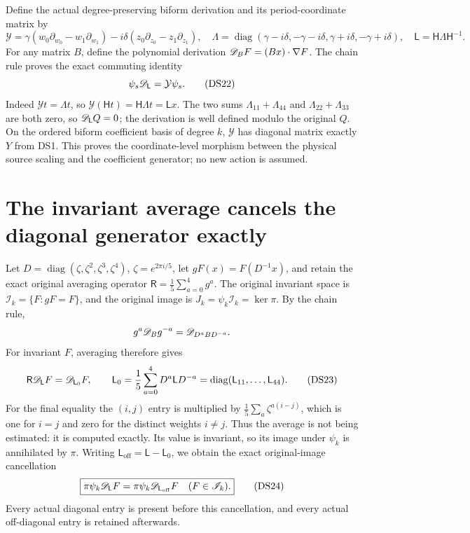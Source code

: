\documentclass[11pt]{article}
\begin{document}
Define the actual degree-preserving biform derivation and its
period-coordinate matrix by
\begin{equation}\label{dsroot:eq:generator}
\mathcal Y=\gamma(w_0\partial_{w_0}-w_1\partial_{w_1})
-i\delta(z_0\partial_{z_0}-z_1\partial_{z_1}),\quad
\Lambda=\operatorname{diag}(\gamma-i\delta,-\gamma-i\delta,
\gamma+i\delta,-\gamma+i\delta),\quad
\mathsf L=\mathsf H\Lambda\mathsf H^{-1}.
\tag{DS21}
\end{equation}
For any matrix \(B\), define the polynomial derivation
\(\mathscr D_BF=(Bx)\cdot\nabla F\). The chain rule proves the exact
commuting identity
\begin{equation}\label{dsroot:eq:generator-map}
\psi_s\mathscr D_{\mathsf L}=\mathcal Y\psi_s.
\tag{DS22}
\end{equation}
Indeed \(\mathcal Yt=\Lambda t\), so
\(\mathcal Y(\mathsf Ht)=\mathsf H\Lambda t=\mathsf Lx\).
The two sums \(\Lambda_{11}+\Lambda_{44}\) and
\(\Lambda_{22}+\Lambda_{33}\) are both zero, so
\(\mathscr D_{\mathsf L}Q=0\); the derivation is well defined modulo
the original \(Q\). On the ordered biform coefficient basis of degree
\(k\), \(\mathcal Y\) has diagonal matrix exactly \(Y\) from DS1.
This proves the coordinate-level morphism between the physical source
scaling and the coefficient generator; no new action is assumed.

\section{The invariant average cancels the diagonal generator exactly}

Let \(D=\operatorname{diag}(\zeta,\zeta^2,\zeta^3,\zeta^4)\),
\(\zeta=e^{2\pi i/5}\), let \(gF(x)=F(D^{-1}x)\), and retain
the exact original averaging operator
\(\mathsf R=\tfrac15\sum_{a=0}^4g^a\).
The original invariant space is \(\mathscr I_k=\{F:gF=F\}\), and
the original image is \(J_k=\psi_k\mathscr I_k=\ker\pi\).
By the chain rule,
\[
g^a\mathscr D_Bg^{-a}=\mathscr D_{D^aBD^{-a}}.
\]
For invariant \(F\), averaging therefore gives
\begin{equation}\label{dsroot:eq:reynolds}
\mathsf R\mathscr D_{\mathsf L}F=\mathscr D_{\mathsf L_0}F,
\qquad
\mathsf L_0=\frac15\sum_{a=0}^4D^a\mathsf LD^{-a}
=\operatorname{diag}(\mathsf L_{11},\ldots,\mathsf L_{44}).
\tag{DS23}
\end{equation}
For the final equality the \((i,j)\) entry is multiplied by
\(\tfrac15\sum_a\zeta^{a(i-j)}\), which is one for \(i=j\)
and zero for the distinct weights \(i\ne j\). Thus the average is
not being estimated: it is computed exactly. Its value is invariant,
so its image under \(\psi_k\) is annihilated by \(\pi\).
Writing \(\mathsf L_{\mathrm{off}}=\mathsf L-\mathsf L_0\), we obtain
the exact original-image cancellation
\begin{equation}\label{dsroot:eq:offdiag-cancellation}
\boxed{\pi\psi_k\mathscr D_{\mathsf L}F
=\pi\psi_k\mathscr D_{\mathsf L_{\mathrm{off}}}F
\quad(F\in\mathscr I_k).}
\tag{DS24}
\end{equation}
Every actual diagonal entry is present before this cancellation, and
every actual off-diagonal entry is retained afterwards.
\end{document}
